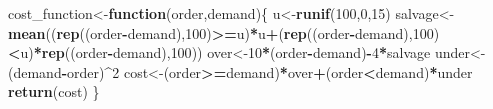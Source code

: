 \documentclass[
]{article}
\newenvironment{Shaded}{\begin{snugshade}}{\end{snugshade}}
\newcommand{\ControlFlowTok}[1]{\textcolor[rgb]{0.13,0.29,0.53}{\textbf{#1}}}
\newcommand{\DataTypeTok}[1]{\textcolor[rgb]{0.13,0.29,0.53}{#1}}
\newcommand{\DecValTok}[1]{\textcolor[rgb]{0.00,0.00,0.81}{#1}}
\newcommand{\KeywordTok}[1]{\textcolor[rgb]{0.13,0.29,0.53}{\textbf{#1}}}
\newcommand{\NormalTok}[1]{#1}
\newcommand{\OperatorTok}[1]{\textcolor[rgb]{0.81,0.36,0.00}{\textbf{#1}}}
\newcommand{\StringTok}[1]{\textcolor[rgb]{0.31,0.60,0.02}{#1}}
\begin{document}
\begin{Shaded}
\begin{Highlighting}[]
\NormalTok{cost_function<-}\ControlFlowTok{function}\NormalTok{(order,demand)\{}
\NormalTok{  u<-}\KeywordTok{runif}\NormalTok{(}\DecValTok{100}\NormalTok{,}\DecValTok{0}\NormalTok{,}\DecValTok{15}\NormalTok{)}
\NormalTok{  salvage<-}\KeywordTok{mean}\NormalTok{((}\KeywordTok{rep}\NormalTok{((order}\OperatorTok{-}\NormalTok{demand),}\DecValTok{100}\NormalTok{)}\OperatorTok{>=}\NormalTok{u)}\OperatorTok{*}\NormalTok{u}\OperatorTok{+}\NormalTok{(}\KeywordTok{rep}\NormalTok{((order}\OperatorTok{-}\NormalTok{demand),}\DecValTok{100}\NormalTok{)}\OperatorTok{<}\NormalTok{u)}\OperatorTok{*}\KeywordTok{rep}\NormalTok{((order}\OperatorTok{-}\NormalTok{demand),}\DecValTok{100}\NormalTok{))}
\NormalTok{  over<-}\DecValTok{10}\OperatorTok{*}\NormalTok{(order}\OperatorTok{-}\NormalTok{demand)}\OperatorTok{-}\DecValTok{4}\OperatorTok{*}\NormalTok{salvage}
\NormalTok{  under<-(demand}\OperatorTok{-}\NormalTok{order)}\OperatorTok{^}\DecValTok{2}
\NormalTok{  cost<-(order}\OperatorTok{>=}\NormalTok{demand)}\OperatorTok{*}\NormalTok{over}\OperatorTok{+}\NormalTok{(order}\OperatorTok{<}\NormalTok{demand)}\OperatorTok{*}\NormalTok{under}
  \KeywordTok{return}\NormalTok{(cost)}
\NormalTok{\}}
\end{Highlighting}
\end{Shaded}

\begin{Shaded}
\end{Shaded}
\end{document}
